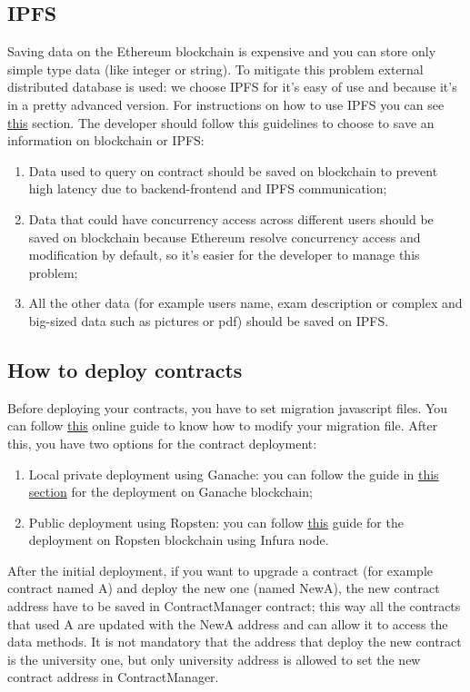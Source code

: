 \subsection{IPFS}
Saving data on the Ethereum blockchain is expensive and you can store only simple type data (like integer or string). To mitigate this problem external distributed database is used: we choose IPFS for it's easy of use and because it's in a pretty advanced version. 
For instructions on how to use IPFS you can see \hyperref[IPFS]{this} section. The developer should follow this guidelines to choose to save an information on blockchain or IPFS:
\begin{enumerate}
	\item Data used to query on contract should be saved on blockchain to prevent high latency due to backend-frontend and IPFS communication;
	\item Data that could have concurrency access across different users should be saved on blockchain because Ethereum resolve concurrency access and modification by default, so it's easier for the developer to manage this problem;
	\item All the other data (for example users name, exam description or complex and big-sized data such as pictures or pdf) should be saved on IPFS.
\end{enumerate}

\newpage
\subsection{How to deploy contracts}
Before deploying your contracts, you have to set migration javascript files. You can follow \href{http://truffleframework.com/docs/getting_started/migrations}{this} online guide to know how to modify your migration file.
After this, you have two options for the contract deployment:
\begin{enumerate}
	\item Local private deployment using Ganache: you can follow the guide in \hyperref[GanacheDeployment]{this section} for the deployment on Ganache blockchain;
	\item Public deployment using Ropsten: you can follow \href{http://truffleframework.com/tutorials/using-infura-custom-provider}{this} guide for the deployment on Ropsten blockchain using Infura node.
\end{enumerate}

After the initial deployment, if you want to upgrade a contract (for example contract named A) and deploy the new one (named NewA), the new contract address have to be saved in ContractManager contract; this way all the contracts that used A are updated with the NewA address and can allow it to access the data methods.
It is not mandatory that the address that deploy the new contract is the university one, but only university address is allowed to set the new contract address in ContractManager.